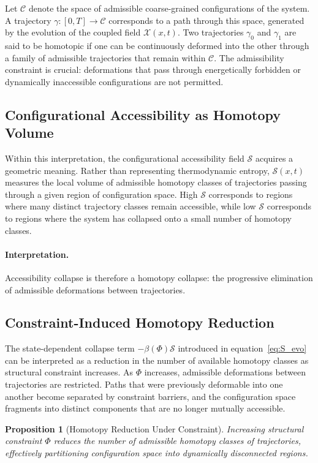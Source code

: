 \documentclass[11pt, a4paper, twocolumn]{article}
\newtheorem{proposition}[definition]{Proposition}
\newcommand{\X}{\mathcal{X}}
\newcommand{\Sfield}{\mathcal{S}}
\begin{document}
Let $\mathcal{C}$ denote the space of admissible coarse-grained configurations
of the system. A trajectory $\gamma : [0,T] \to \mathcal{C}$ corresponds to a
path through this space, generated by the evolution of the coupled field
$\X(x,t)$. Two trajectories $\gamma_0$ and $\gamma_1$ are said to be homotopic
if one can be continuously deformed into the other through a family of admissible
trajectories that remain within $\mathcal{C}$. The admissibility constraint is
crucial: deformations that pass through energetically forbidden or dynamically
inaccessible configurations are not permitted.

\subsection{Configurational Accessibility as Homotopy Volume}

Within this interpretation, the configurational accessibility field $\Sfield$
acquires a geometric meaning. Rather than representing thermodynamic entropy,
$\Sfield(x,t)$ measures the local volume of admissible homotopy classes of
trajectories passing through a given region of configuration space. High
$\Sfield$ corresponds to regions where many distinct trajectory classes remain
accessible, while low $\Sfield$ corresponds to regions where the system has
collapsed onto a small number of homotopy classes.

\paragraph{Interpretation.}
Accessibility collapse is therefore a homotopy collapse: the progressive
elimination of admissible deformations between trajectories.

\subsection{Constraint-Induced Homotopy Reduction}

The state-dependent collapse term $-\beta(\Phi)\Sfield$ introduced in
equation~\eqref{eq:S_evo} can be interpreted as a reduction in the number of
available homotopy classes as structural constraint increases. As $\Phi$
increases, admissible deformations between trajectories are restricted. Paths
that were previously deformable into one another become separated by constraint
barriers, and the configuration space fragments into distinct components that
are no longer mutually accessible.

\begin{proposition}[Homotopy Reduction Under Constraint]
Increasing structural constraint $\Phi$ reduces the number of admissible
homotopy classes of trajectories, effectively partitioning configuration
space into dynamically disconnected regions.
\end{proposition}
\end{document}
